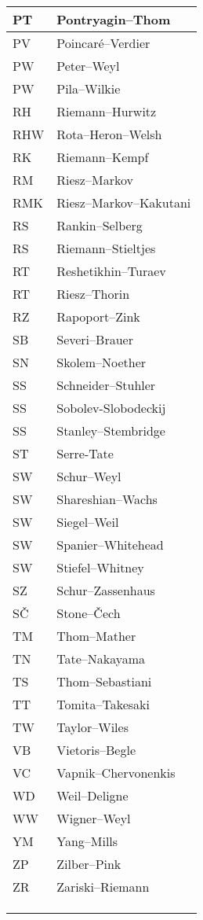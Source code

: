 \documentclass{amsart}
\numberwithin{equation}{section}
\theoremstyle{plain}
\numberwithin{equation}{section}
\theoremstyle{remark}
\begin{document}
\begin{multicols}{2}
{\begin{longtable}{l|l}
PT & Pontryagin--Thom\\ \hline
PV & Poincaré--Verdier\\ \hline
PW & Peter--Weyl\\ \hline
PW & Pila--Wilkie\\ \hline
RH & Riemann--Hurwitz\\ \hline
RHW & Rota--Heron--Welsh\\ \hline
RK & Riemann--Kempf\\ \hline
RM & Riesz--Markov\\ \hline
RMK & Riesz--Markov--Kakutani\\ \hline
RS & Rankin--Selberg\\ \hline
RS & Riemann--Stieltjes\\ \hline
RT & Reshetikhin--Turaev\\ \hline
RT & Riesz--Thorin\\ \hline
RZ & Rapoport--Zink\\ \hline
SB & Severi--Brauer\\ \hline
SN & Skolem--Noether\\ \hline
SS & Schneider--Stuhler\\ \hline
SS & Sobolev-Slobodeckij\\ \hline
SS & Stanley--Stembridge\\ \hline
ST & Serre-Tate\\ \hline
SW & Schur--Weyl\\ \hline
SW & Shareshian--Wachs\\ \hline
SW & Siegel--Weil\\ \hline
SW & Spanier--Whitehead\\ \hline
SW & Stiefel--Whitney\\ \hline
SZ & Schur--Zassenhaus\\ \hline
SČ & Stone--Čech\\ \hline
TM & Thom--Mather\\ \hline
TN & Tate--Nakayama\\ \hline
TS & Thom--Sebastiani\\ \hline
TT & Tomita--Takesaki\\ \hline
TW & Taylor--Wiles\\ \hline
VB & Vietoris--Begle\\ \hline
VC & Vapnik--Chervonenkis\\ \hline
WD & Weil--Deligne\\ \hline
WW & Wigner--Weyl\\ \hline
YM & Yang--Mills\\ \hline
ZP & Zilber--Pink\\ \hline
ZR & Zariski--Riemann\\ \hline
 & \\ \hline
 & \\ \hline
 & \\ \hline
\end{longtable}
\unskip
\unpenalty
\unpenalty}

\unvbox\ltmcbox




\end{multicols}
\end{document}
